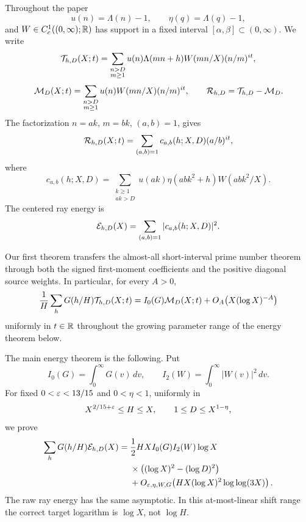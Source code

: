 Throughout the paper
\[
 u(n)=\Lambda(n)-1,
 \qquad
 \eta(q)=\Lambda(q)-1,
\]
and $W\in C_c^1((0,\infty);\mathbb R)$ has support in a fixed interval
$[\alpha,\beta]\subset(0,\infty)$.  We write
\begin{equation}
 \mathcal T_{h,D}(X;t)=
 \sum_{\substack{n>D\\m\geq1}}
 u(n)\Lambda(mn+h)W(mn/X)(n/m)^{it},
 \label{eq:intro-raw-transform}
\end{equation}
\begin{equation}
 \mathcal M_D(X;t)=
 \sum_{\substack{n>D\\m\geq1}}
 u(n)W(mn/X)(n/m)^{it},
 \qquad
 \mathcal R_{h,D}=\mathcal T_{h,D}-\mathcal M_D.
 \label{eq:intro-centered-transform}
\end{equation}
The factorization $n=ak$, $m=bk$, $(a,b)=1$, gives
\begin{equation}
 \mathcal R_{h,D}(X;t)=
 \sum_{(a,b)=1}c_{a,b}(h;X,D)(a/b)^{it},
 \label{eq:intro-ray-compression}
\end{equation}
where
\begin{equation}
 c_{a,b}(h;X,D)=
 \sum_{\substack{k\geq1\\ak>D}}
 u(ak)\eta(abk^2+h)W(abk^2/X).
 \label{eq:intro-ray-coefficient}
\end{equation}
The centered ray energy is
\begin{equation}
 \mathcal E_{h,D}(X)=\sum_{(a,b)=1}|c_{a,b}(h;X,D)|^2.
 \label{eq:intro-ray-energy}
\end{equation}

Our first theorem transfers the almost-all short-interval prime number
theorem through both the signed first-moment coefficients and the positive
diagonal source weights.  In particular, for every $A>0$,
\begin{equation}
 \frac1H\sum_hG(h/H)\mathcal T_{h,D}(X;t)
 =I_0(G)\mathcal M_D(X;t)+O_A\bigl(X(\log X)^{-A}\bigr)
 \label{eq:intro-first-moment}
\end{equation}
uniformly in $t\in\mathbb R$ throughout the growing parameter range of the
energy theorem below.

The main energy theorem is the following.  Put
\begin{equation}
 I_0(G)=\int_0^\infty G(v)\,dv,
 \qquad
 I_2(W)=\int_0^\infty |W(v)|^2\,dv.
 \label{eq:intro-moments}
\end{equation}
For fixed $0<\varepsilon<13/15$ and $0<\eta<1$, uniformly in
\[
 X^{2/15+\varepsilon}\leq H\leq X,
 \qquad
 1\leq D\leq X^{1-\eta},
\]
we prove
\begin{equation}
 \begin{aligned}
 \sum_hG(h/H)\mathcal E_{h,D}(X)
 ={}&\frac12HX I_0(G)I_2(W)\log X\\
 &\times\bigl((\log X)^2-(\log D)^2\bigr)\\
 &+O_{\varepsilon,\eta,W,G}\!\left(
 HX(\log X)^2\log\log(3X)\right).
 \end{aligned}
 \label{eq:intro-main-energy}
\end{equation}
The raw ray energy has the same asymptotic.  In this at-most-linear shift
range the correct target logarithm is $\log X$, not $\log H$.

